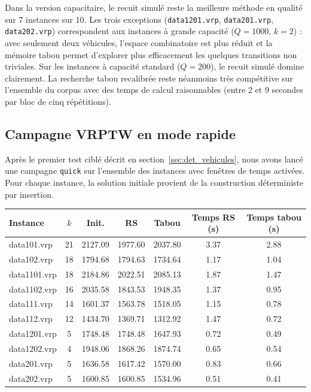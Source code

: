 \documentclass[11pt,a4paper]{article}
\begin{document}
Dans la version capacitaire, le recuit simulé reste la meilleure méthode en qualité sur 7 instances sur 10. Les trois exceptions (\texttt{data1201.vrp}, \texttt{data201.vrp}, \texttt{data202.vrp}) correspondent aux instances à grande capacité ($Q=1000$, $k=2$) : avec seulement deux véhicules, l'espace combinatoire est plus réduit et la mémoire tabou permet d'explorer plus efficacement les quelques transitions non triviales. Sur les instances à capacité standard ($Q=200$), le recuit simulé domine clairement. La recherche tabou recalibrée reste néanmoins très compétitive sur l'ensemble du corpus avec des temps de calcul raisonnables (entre 2 et 9 secondes par bloc de cinq répétitions).

\subsection{Campagne VRPTW en mode rapide}
\label{sec:vrptw_quick}
Après le premier test ciblé décrit en section~\ref{sec:det_vehicules}, nous avons lancé une campagne \texttt{quick} sur l'ensemble des instances avec fenêtres de temps activées. Pour chaque instance, la solution initiale provient de la construction déterministe par insertion.

\begin{center}
\begin{tabular}{lcccccc}
\toprule
Instance & \(k\) & Init. & RS & Tabou & Temps RS (s) & Temps tabou (s) \\
\midrule
data101.vrp  & 21 & 2127.09 & 1977.60 & 2037.80 & 3.37 & 2.88 \\
data102.vrp  & 18 & 1794.68 & 1794.63 & 1734.64 & 1.17 & 1.04 \\
data1101.vrp & 18 & 2184.86 & 2022.51 & 2085.13 & 1.87 & 1.47 \\
data1102.vrp & 16 & 2035.58 & 1843.53 & 1948.35 & 1.37 & 0.95 \\
data111.vrp  & 14 & 1601.37 & 1563.78 & 1518.05 & 1.15 & 0.78 \\
data112.vrp  & 12 & 1434.70 & 1369.71 & 1312.92 & 1.47 & 0.72 \\
data1201.vrp & 5  & 1748.48 & 1748.48 & 1647.93 & 0.72 & 0.49 \\
data1202.vrp & 4  & 1948.06 & 1868.26 & 1874.74 & 0.65 & 0.54 \\
data201.vrp  & 5  & 1636.58 & 1617.42 & 1570.00 & 0.83 & 0.66 \\
data202.vrp  & 5  & 1600.85 & 1600.85 & 1534.96 & 0.51 & 0.41 \\
\bottomrule
\end{tabular}
\end{center}
\end{document}
